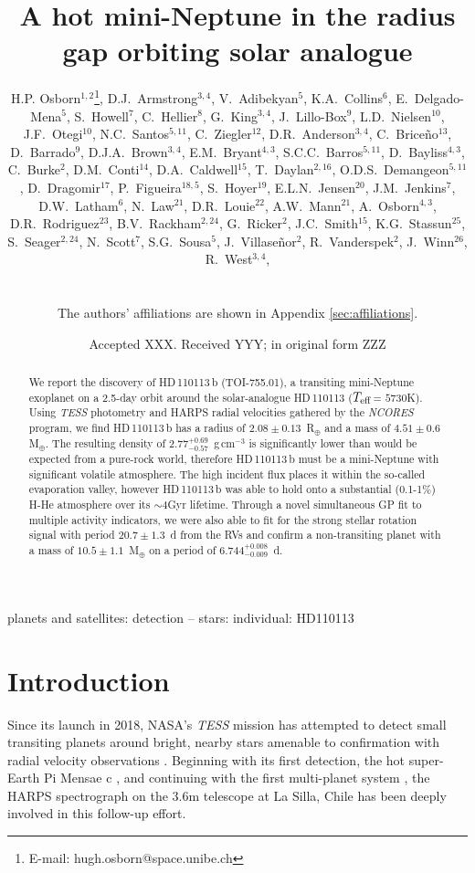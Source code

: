 \documentclass[fleqn,usenatbib]{mnras}
\title[\Tplanet{}]{A hot mini-Neptune in the radius gap orbiting solar analogue \Tstar{}}
\author[H.P. Osborn et al.]{\parbox{\textwidth}{H.P. Osborn$^{1,2}$\thanks{E-mail: hugh.osborn@space.unibe.ch}, 
D.J.~Armstrong$^{3,4}$, %
V.~Adibekyan$^{5}$, %
K.A.~Collins$^{6}$, %
E.~Delgado-Mena$^{5}$, %
S.~Howell$^{7}$, %
C.~Hellier$^{8}$, %
G.~King$^{3,4}$, %
J.~Lillo-Box$^{9}$, %
L.D.~Nielsen$^{10}$, %
J.F.~Otegi$^{10}$, %
N.C.~Santos$^{5,11}$, %
C.~Ziegler$^{12}$, %
D.R.~Anderson$^{3,4}$, %
C.~Brice\~{n}o$^{13}$, %
D.~Barrado$^{9}$, %
D.J.A.~Brown$^{3,4}$, %
E.M.~Bryant$^{4,3}$, %
S.C.C.~Barros$^{5,11}$, %
D.~Bayliss$^{4,3}$, %
C.~Burke$^{2}$, %
D.M.~Conti$^{14}$, %
D.A.~Caldwell$^{15}$, %
T.~Daylan$^{2,16}$, %
O.D.S.~Demangeon$^{5,11}$, %
D.~Dragomir$^{17}$, %
P.~Figueira$^{18,5}$, %
S.~Hoyer$^{19}$, %
E.L.N.~Jensen$^{20}$, %
J.M.~Jenkins$^{7}$, %
D.W.~Latham$^{6}$, %
N.~Law$^{21}$, %
D.R.~Louie$^{22}$, %
A.W.~Mann$^{21}$, %
A.~Osborn$^{4,3}$, %
D.R.~Rodriguez$^{23}$, %
B.V.~Rackham$^{2,24}$, %
G.~Ricker$^{2}$, %
J.C.~Smith$^{15}$, %
K.G.~Stassun$^{25}$, %
S.~Seager$^{2,24}$, %
N.~Scott$^{7}$, %
S.G.~Sousa$^{5}$, %
J.~Villaseñor$^{2}$, %
R.~Vanderspek$^{2}$, %
J.~Winn$^{26}$, %
R.~West$^{3,4}$, %
}\\
\parbox{\textwidth}{
The authors' affiliations are shown in Appendix \ref{sec:affiliations}.}
}
\date{Accepted XXX. Received YYY; in original form ZZZ}
\newcommand{\gcm}{g\,cm$^{-3}$}	%
\newcommand{\tess}{{\it TESS}}
\newcommand{\harps}{{HARPS}}
\newcommand{\rearth}{R$_{\oplus}$}
\newcommand{\mearth}{M$_{\oplus}$}
\newcommand{\teff}{$T_{\rm eff}$}
\newcommand{\TPone}{ $ 6.744^{+0.008}_{-0.009} $ }
\newcommand{\TMpzero}{ $ 4.51 \pm 0.6 $ }
\newcommand{\TMpone}{ $ 10.5 \pm 1.1 $ }
\newcommand{\Trpl}{ $ 2.08 \pm 0.13 $ }
\newcommand{\Trhopgcmthree}{ $ 2.77^{+0.69}_{-0.57} $ }
\newcommand{\Tperiod}{ $ 20.7 \pm 1.3 $ }
\newcommand{\TTplanet}{TOI-755.01}
\newcommand{\Tstar}{HD\,110113}
\newcommand{\Tplanet}{HD\,110113\,b}
\begin{document}
\label{firstpage}
\pagerange{\pageref{firstpage}--\pageref{lastpage}}
\maketitle

\begin{abstract}
We report the discovery of \Tplanet{} (\TTplanet{}), a transiting mini-Neptune exoplanet on a 2.5-day orbit around the solar-analogue \Tstar{} (\teff{}= $5730$K).
Using \tess{} photometry and \harps{} radial velocities gathered by the \textit{NCORES} program, we find \Tplanet{} has a radius of \Trpl{}\,\rearth{} and a mass of \TMpzero{}\,\mearth{}.
The resulting density of \Trhopgcmthree{}\,\gcm{} is significantly lower than would be expected from a pure-rock world, therefore \Tplanet{} must be a mini-Neptune with significant volatile atmosphere.
The high incident flux places it within the so-called evaporation valley, however \Tplanet{} was able to hold onto a substantial (0.1-1\%) H-He atmosphere over its $\sim4$Gyr lifetime.
Through a novel simultaneous GP fit to multiple activity indicators, we were also able to fit for the strong stellar rotation signal with period \Tperiod{}\,d from the RVs and confirm a non-transiting planet with a mass of \TMpone{}\,\mearth{} on a period of \TPone{}\,d.
\end{abstract}

\begin{keywords}
planets and satellites: detection -- stars: individual: HD110113
\end{keywords}



\section{Introduction}
Since its launch in 2018, NASA's \tess{} mission has attempted to detect small transiting planets around bright, nearby stars amenable to confirmation with radial velocity observations \citep{ricker2010transiting}.
Beginning with its first detection, the hot super-Earth Pi Mensae c \citep{huang2018tess}, and continuing with the first multi-planet system \citep[TOI-125][]{quinn2019near,nielsen2020mass}, the \harps{} spectrograph on the 3.6m telescope at La Silla, Chile \citep{2003Msngr.114...20M} has been deeply involved in this follow-up effort.
\end{document}
